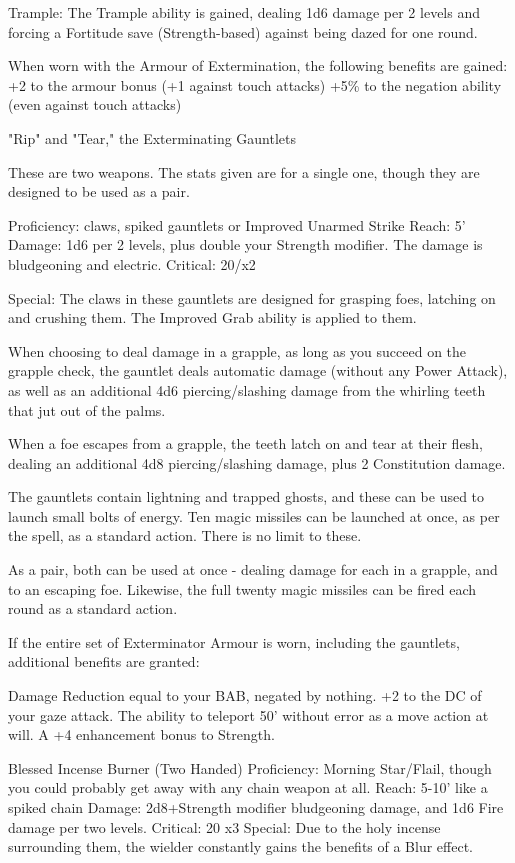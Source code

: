 Trample: The Trample ability is gained, dealing 1d6 damage per 2 levels and forcing a Fortitude save (Strength-based) against being dazed for one round.

When worn with the Armour of Extermination, the following benefits are gained:
+2 to the armour bonus (+1 against touch attacks)
+5\% to the negation ability (even against touch attacks)



"Rip" and "Tear," the Exterminating Gauntlets

These are two weapons. The stats given are for a single one, though they are designed to be used as a pair.

Proficiency: claws, spiked gauntlets or Improved Unarmed Strike
Reach: 5'
Damage: 1d6 per 2 levels, plus double your Strength modifier. The damage is bludgeoning and electric.
Critical: 20/x2

Special:
The claws in these gauntlets are designed for grasping foes, latching on and crushing them. The Improved Grab ability is applied to them.

When choosing to deal damage in a grapple, as long as you succeed on the grapple check, the gauntlet deals automatic damage (without any Power Attack), as well as an additional 4d6 piercing/slashing damage from the whirling teeth that jut out of the palms.

When a foe escapes from a grapple, the teeth latch on and tear at their flesh, dealing an additional 4d8 piercing/slashing damage, plus 2 Constitution damage.

The gauntlets contain lightning and trapped ghosts, and these can be used to launch small bolts of energy. Ten magic missiles can be launched at once, as per the spell, as a standard action. There is no limit to these.

As a pair, both can be used at once - dealing damage for each in a grapple, and to an escaping foe. Likewise, the full twenty magic missiles can be fired each round as a standard action.

If the entire set of Exterminator Armour is worn, including the gauntlets, additional benefits are granted:

Damage Reduction equal to your BAB, negated by nothing.
+2 to the DC of your gaze attack.
The ability to teleport 50' without error as a move action at will.
A +4 enhancement bonus to Strength.




Blessed Incense Burner (Two Handed)
Proficiency: Morning Star/Flail, though you could probably get away with any chain weapon at all.
Reach: 5-10' like a spiked chain
Damage: 2d8+Strength modifier bludgeoning damage, and 1d6 Fire damage per two levels.
Critical: 20 x3
Special:
Due to the holy incense surrounding them, the wielder constantly gains the benefits of a Blur effect.

